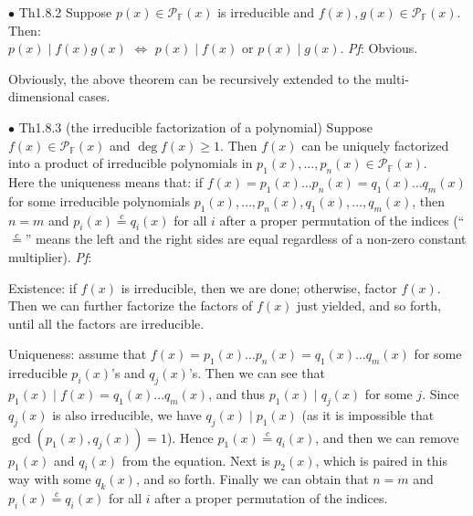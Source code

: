 \documentclass{article}
\begin{document}
\begin{Th}{$\bullet$ Th1.8.2}
    Suppose $p(x)\in\mathcal{P}_\mathbb{F}(x)$ is irreducible and $f(x), g(x)\in\mathcal{P}_\mathbb{F}(x)$. Then:\\
    $p(x)\mid f(x)g(x)$ $\Leftrightarrow$ $p(x)\mid f(x)$ or $p(x)\mid g(x)$.
    \tcblower
    \textit{Pf}: Obvious.
\end{Th}

\begin{Rmk}{}
    Obviously, the above theorem can be recursively extended to the multi-dimensional cases.
\end{Rmk}

\begin{Th}{$\bullet$ Th1.8.3 (the irreducible factorization of a polynomial)}
    Suppose $f(x)\in\mathcal{P}_\mathbb{F}(x)$ and $\deg f(x)\geq 1$. Then $f(x)$ can be uniquely factorized into a product of irreducible polynomials in $p_1(x), \dots, p_n(x)\in\mathcal{P}_\mathbb{F}(x)$. \\
    Here the uniqueness means that:
    if $f(x) = p_1(x)\dots p_n(x) = q_1(x)\dots q_m(x)$ for some irreducible polynomials $p_1(x), \dots, p_n(x), q_1(x), \dots, q_m(x)$, then $n = m$ and $p_i(x)\overset{c}{=}q_i(x)$ for all $i$ after a proper permutation of the indices (``$\overset{c}{=}$'' means the left and the right sides are equal regardless of a non-zero constant multiplier).
    \tcblower
    \textit{Pf}: 
    \begin{compactitem}
        \item Existence: if $f(x)$ is irreducible, then we are done; otherwise, factor $f(x)$. Then we can further factorize the factors of $f(x)$ just yielded, and so forth, until all the factors are irreducible.
        \item Uniqueness: assume that $f(x) = p_1(x)\dots p_n(x) = q_1(x)\dots q_m(x)$ for some irreducible $p_i(x)$'s and $q_j(x)$'s. Then we can see that $p_1(x)\mid f(x) = q_1(x)\dots q_m(x)$, and thus $p_1(x)\mid q_j(x)$ for some $j$. Since $q_j(x)$ is also irreducible, we have $q_j(x)\mid p_1(x)$ (as it is impossible that $\gcd(p_1(x), q_j(x)) = 1$). Hence $p_1(x)\overset{c}{=}q_i(x)$, and then we can remove $p_1(x)$ and $q_i(x)$ from the equation. Next is $p_2(x)$, which is paired in this way with some $q_k(x)$, and so forth. Finally we can obtain that $n = m$ and $p_i(x)\overset{c}{=}q_i(x)$ for all $i$ after a proper permutation of the indices.
    \end{compactitem}
\end{Th}
\end{document}
